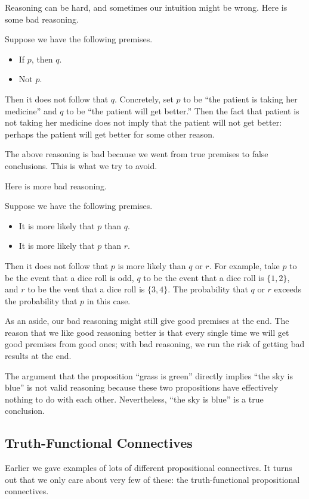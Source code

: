 Reasoning can be hard, and sometimes our intuition might be wrong. Here is some bad reasoning.
\begin{nex}
	Suppose we have the following premises.
	\begin{itemize}
		\item If $p$, then $q$.
		\item Not $p$.
	\end{itemize}
	Then it does not follow that $q$. Concretely, set $p$ to be ``the patient is taking her medicine'' and $q$ to be ``the patient will get better.'' Then the fact that patient is not taking her medicine does not imply that the patient will not get better: perhaps the patient will get better for some other reason.
\end{nex}
The above reasoning is bad because we went from true premises to false conclusions. This is what we try to avoid.

Here is more bad reasoning.
\begin{nex}
	Suppose we have the following premises.
	\begin{itemize}
		\item It is more likely that $p$ than $q$.
		\item It is more likely that $p$ than $r$.
	\end{itemize}
	Then it does not follow that $p$ is more likely than $q$ or $r$. For example, take $p$ to be the event that a dice roll is odd, $q$ to be the event that a dice roll is $\{1,2\}$, and $r$ to be the vent that a dice roll is $\{3,4\}$. The probability that $q$ or $r$ exceeds the probability that $p$ in this case.
\end{nex}
As an aside, our bad reasoning might still give good premises at the end. The reason that we like good reasoning better is that every single time we will get good premises from good ones; with bad reasoning, we run the risk of getting bad results at the end.
\begin{example}
	The argument that the proposition ``grass is green'' directly implies ``the sky is blue'' is not valid reasoning because these two propositions have effectively nothing to do with each other. Nevertheless, ``the sky is blue'' is a true conclusion.
\end{example}

\subsection{Truth-Functional Connectives}
Earlier we gave examples of lots of different propositional connectives. It turns out that we only care about very few of these: the truth-functional propositional connectives.

